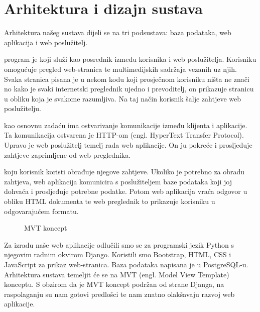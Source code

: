 \chapter{Arhitektura i dizajn sustava}
		


		Arhitektura našeg sustava dijeli se na tri podsustava: baza podataka, web aplikacija i web poslužitelj.
			
		 program je koji služi kao posrednik između korisnika i web poslužitelja. Korisniku omogućuje pregled web-stranica te multimedijskih sadržaja vezanih uz njih. Svaka stranica pisana je u nekom kodu koji prosječnom korisniku ništa ne znači no kako je svaki internetski preglednik ujedno i prevoditelj, on prikazuje stranicu u obliku koja je svakome razumljiva. Na taj način korisnik šalje zahtjeve web poslužitelju.
		
		 kao osnovnu zadaću ima ostvarivanje komunikacije između klijenta i aplikacije.  Ta komunikacija ostvarena je HTTP-om (engl. HyperText Transfer Protocol). Upravo je web poslužitelj temelj rada web aplikacije. On ju pokreće i prosljeđuje zahtjeve zaprimljene od web preglednika.
		
		 koju korisnik koristi obrađuje njegove zahtjeve. Ukoliko je potrebno za obradu zahtjeva, web aplikacija komunicira s poslužiteljem baze podataka koji joj dohvaća i prosljeđuje potrebne podatke. Potom web aplikacija vraća odgovor u obliku HTML dokumenta te web preglednik to prikazuje korisniku u odgovarajućem formatu.
		\begin{figure}
			\centering
			\caption{MVT koncept}
			\label{fig:mvt}
		\end{figure}
		Za izradu naše web aplikacije odlučili smo se za programski jezik Python s njegovim radnim okvirom Django. Koristili smo Bootstrap, HTML, CSS i JavaScript za prikaz web-stranica. Baza podataka napisana je u PostgreSQL-u. Arhitektura sustava temeljit će se na MVT (engl. Model View Template) konceptu. S obzirom da je MVT koncept podržan od strane Djanga, na raspolaganju su nam gotovi predlošci te nam znatno olakšavaju razvoj web aplikacije.
	
